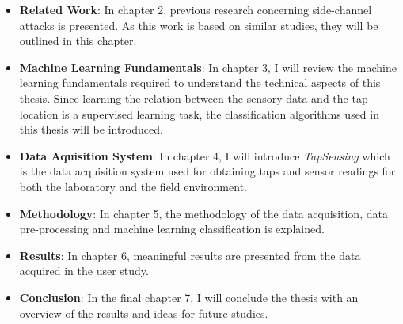 \begin{itemize}
  \item \textbf{Related Work}: In chapter 2, previous research concerning side-channel attacks is presented. As this work is based on similar studies, they will be outlined in this chapter.
  \item \textbf{Machine Learning Fundamentals}: In chapter 3, I will review the machine learning fundamentals required to understand the technical aspects of this thesis. Since learning the relation between the sensory data and the tap location is a supervised learning task, the classification algorithms used in this thesis will be introduced.
  \item \textbf{Data Aquisition System}: In chapter 4, I will introduce \textit{TapSensing} which is the data acquisition system used for obtaining taps and sensor readings for both the laboratory and the field environment.
  \item \textbf{Methodology}: In chapter 5, the methodology of the data acquisition, data pre-processing and machine learning classification is explained.
  \item \textbf{Results}: In chapter 6, meaningful results are presented from the data acquired in the user study.
  \item \textbf{Conclusion}: In the final chapter 7, I will conclude the thesis with an overview of the results and ideas for future studies.
\end{itemize}









